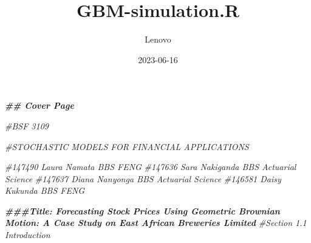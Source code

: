 \documentclass[
]{article}
\title{GBM-simulation.R}
\author{Lenovo}
\date{2023-06-16}
\newenvironment{Shaded}{\begin{snugshade}}{\end{snugshade}}
\newcommand{\CommentTok}[1]{\textcolor[rgb]{0.56,0.35,0.01}{\textit{#1}}}
\newcommand{\DocumentationTok}[1]{\textcolor[rgb]{0.56,0.35,0.01}{\textbf{\textit{#1}}}}
\begin{document}
\maketitle

\begin{Shaded}
\begin{Highlighting}[]
\DocumentationTok{\#\# Cover Page}

\CommentTok{\#BSF 3109  }
  
\CommentTok{\#STOCHASTIC MODELS FOR FINANCIAL APPLICATIONS}

\CommentTok{\#147490 Laura Namata    BBS FENG }
\CommentTok{\#147636 Sara Nakiganda  BBS Actuarial Science}
\CommentTok{\#147637 Diana Nanyonga  BBS Actuarial Science}
\CommentTok{\#146581 Daisy Kukunda   BBS FENG}

\DocumentationTok{\#\#\#Title: Forecasting Stock Prices Using Geometric Brownian Motion: A Case Study on East African Breweries Limited}
\CommentTok{\#Section 1.1 Introduction}


\end{Highlighting}
\end{Shaded}
\end{document}
